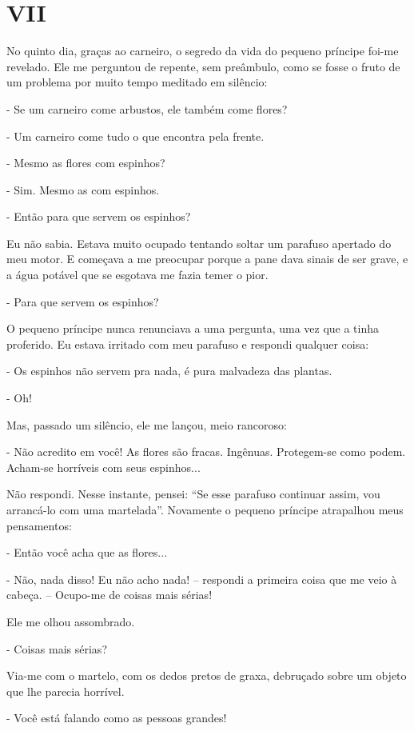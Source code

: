 \chapter{VII}

No quinto dia, graças ao carneiro, o segredo da vida do pequeno príncipe
foi-me revelado. Ele me perguntou de repente, sem preâmbulo, como se
fosse o fruto de um problema por muito tempo meditado em silêncio:

- Se um carneiro come arbustos, ele também come flores?

- Um carneiro come tudo o que encontra pela frente.

- Mesmo as flores com espinhos?

- Sim. Mesmo as com espinhos.

- Então para que servem os espinhos?

Eu não sabia. Estava muito ocupado tentando soltar um parafuso apertado
do meu motor. E começava a me preocupar porque a pane dava sinais de ser
grave, e a água potável que se esgotava me fazia temer o pior.

- Para que servem os espinhos?

O pequeno príncipe nunca renunciava a uma pergunta, uma vez que a tinha
proferido. Eu estava irritado com meu parafuso e respondi qualquer
coisa:

- Os espinhos não servem pra nada, é pura malvadeza das plantas.

- Oh!

Mas, passado um silêncio, ele me lançou, meio rancoroso:

- Não acredito em você! As flores são fracas. Ingênuas. Protegem-se como
podem. Acham-se horríveis com seus espinhos...

Não respondi. Nesse instante, pensei: ``Se esse parafuso continuar
assim, vou arrancá-lo com uma martelada''. Novamente o pequeno príncipe
atrapalhou meus pensamentos:

- Então você acha que as flores...

- Não, nada disso! Eu não acho nada! -- respondi a primeira coisa que me
veio à cabeça. -- Ocupo-me de coisas mais sérias!

Ele me olhou assombrado.

- Coisas mais sérias?

Via-me com o martelo, com os dedos pretos de graxa, debruçado sobre um
objeto que lhe parecia horrível.

- Você está falando como as pessoas grandes!

